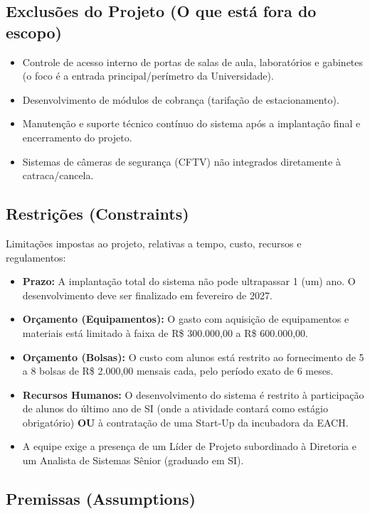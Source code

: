 \documentclass[a4paper]{article}
\begin{document}
\subsection{Exclusões do Projeto (O que está fora do escopo)}

\begin{itemize}
    \item Controle de acesso interno de portas de salas de aula, laboratórios e gabinetes (o foco é a entrada principal/perímetro da Universidade).
    \item Desenvolvimento de módulos de cobrança (tarifação de estacionamento).
    \item Manutenção e suporte técnico contínuo do sistema após a implantação final e encerramento do projeto.
    \item Sistemas de câmeras de segurança (CFTV) não integrados diretamente à catraca/cancela.
\end{itemize}

\subsection{Restrições (Constraints)}

Limitações impostas ao projeto, relativas a tempo, custo, recursos e regulamentos:

\begin{itemize}
    \item \textbf{Prazo:} A implantação total do sistema não pode ultrapassar 1 (um) ano. O desenvolvimento deve ser finalizado em fevereiro de 2027.
    \item \textbf{Orçamento (Equipamentos):} O gasto com aquisição de equipamentos e materiais está limitado à faixa de R\$ 300.000,00 a R\$ 600.000,00.
    \item \textbf{Orçamento (Bolsas):} O custo com alunos está restrito ao fornecimento de 5 a 8 bolsas de R\$ 2.000,00 mensais cada, pelo período exato de 6 meses.
    \item \textbf{Recursos Humanos:} O desenvolvimento do sistema é restrito à participação de alunos do último ano de SI (onde a atividade contará como estágio obrigatório) \textbf{OU} à contratação de uma Start-Up da incubadora da EACH.
    \item A equipe exige a presença de um Líder de Projeto subordinado à Diretoria e um Analista de Sistemas Sênior (graduado em SI).
\end{itemize}

\subsection{Premissas (Assumptions)}
\end{document}

